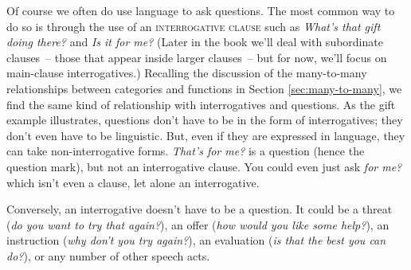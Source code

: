 Of course we often do use language to ask questions. The most common way to do so is through the use of an \textsc{interrogative clause} such as \textit{What's that gift doing there?} and \textit{Is it for me?} (Later in the book we'll deal with subordinate clauses~-- those that appear inside larger clauses~-- but for now, we'll focus on main-clause interrogatives.) Recalling the discussion of the many-to-many relationships between categories and functions in Section \ref{sec:many-to-many}, we find the same kind of relationship with interrogatives and questions. As the gift example illustrates, questions don't have to be in the form of interrogatives; they don't even have to be linguistic. But, even if they are expressed in language, they can take non-interrogative forms. \textit{That's for me?} is a question (hence the question mark), but not an interrogative clause. You could even just ask \textit{for me?} which isn't even a clause, let alone an interrogative.

Conversely, an interrogative doesn't have to be a question. It could be a threat (\textit{do you want to try that again?}), an offer (\textit{how would you like some help?}), an instruction (\textit{why don't you try again?}), an evaluation (\textit{is that the best you can do?}), or any number of other speech acts.

